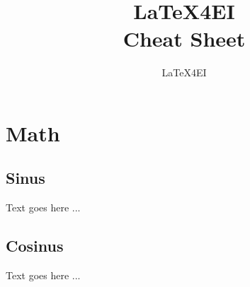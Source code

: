 \documentclass[english]{latex4ei/latex4ei_sheet}
\title{LaTeX4EI \\ Cheat Sheet}
\author{LaTeX4EI}					%
\begin{document}
\ifdefined\GitRevision{}\fi
\ifdefined\GitIssuesURL
  \ifdefined\setissueslinkurl
    \setissueslinkurl{\GitIssuesURL} %
  \fi
\fi

\maketitle   %


\section{Math}


\begin{sectionbox}
	\subsection{Sinus}

	Text goes here ...


\end{sectionbox}


\begin{sectionbox}
	\subsection{Cosinus}

	Text goes here ...


\end{sectionbox}





\end{document}
